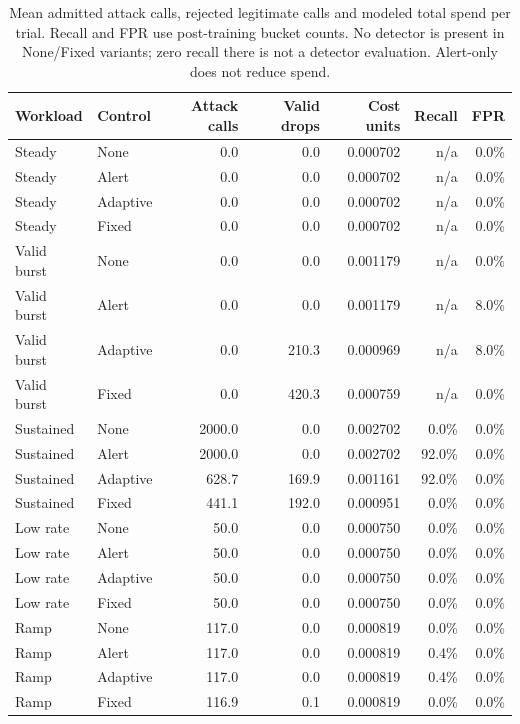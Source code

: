\documentclass[11pt,a4paper]{article}
\begin{document}
\begin{table}[htbp]
\centering\footnotesize
\begin{tabularx}{\linewidth}{@{}Ylrrrrr@{}}
\toprule
Workload & Control & Attack calls & Valid drops & Cost units & Recall & FPR \\
\midrule
Steady & None & 0.0 & 0.0 & 0.000702 & n/a & 0.0\% \\
Steady & Alert & 0.0 & 0.0 & 0.000702 & n/a & 0.0\% \\
Steady & Adaptive & 0.0 & 0.0 & 0.000702 & n/a & 0.0\% \\
Steady & Fixed & 0.0 & 0.0 & 0.000702 & n/a & 0.0\% \\
Valid burst & None & 0.0 & 0.0 & 0.001179 & n/a & 0.0\% \\
Valid burst & Alert & 0.0 & 0.0 & 0.001179 & n/a & 8.0\% \\
Valid burst & Adaptive & 0.0 & 210.3 & 0.000969 & n/a & 8.0\% \\
Valid burst & Fixed & 0.0 & 420.3 & 0.000759 & n/a & 0.0\% \\
Sustained & None & 2000.0 & 0.0 & 0.002702 & 0.0\% & 0.0\% \\
Sustained & Alert & 2000.0 & 0.0 & 0.002702 & 92.0\% & 0.0\% \\
Sustained & Adaptive & 628.7 & 169.9 & 0.001161 & 92.0\% & 0.0\% \\
Sustained & Fixed & 441.1 & 192.0 & 0.000951 & 0.0\% & 0.0\% \\
Low rate & None & 50.0 & 0.0 & 0.000750 & 0.0\% & 0.0\% \\
Low rate & Alert & 50.0 & 0.0 & 0.000750 & 0.0\% & 0.0\% \\
Low rate & Adaptive & 50.0 & 0.0 & 0.000750 & 0.0\% & 0.0\% \\
Low rate & Fixed & 50.0 & 0.0 & 0.000750 & 0.0\% & 0.0\% \\
Ramp & None & 117.0 & 0.0 & 0.000819 & 0.0\% & 0.0\% \\
Ramp & Alert & 117.0 & 0.0 & 0.000819 & 0.4\% & 0.0\% \\
Ramp & Adaptive & 117.0 & 0.0 & 0.000819 & 0.4\% & 0.0\% \\
Ramp & Fixed & 116.9 & 0.1 & 0.000819 & 0.0\% & 0.0\% \\
\bottomrule
\end{tabularx}
\caption{Mean admitted attack calls, rejected legitimate calls and modeled total spend per trial. Recall and FPR use post-training bucket counts. No detector is present in None/Fixed variants; zero recall there is not a detector evaluation. Alert-only does not reduce spend.}\label{tab:billing}
\end{table}
\end{document}

